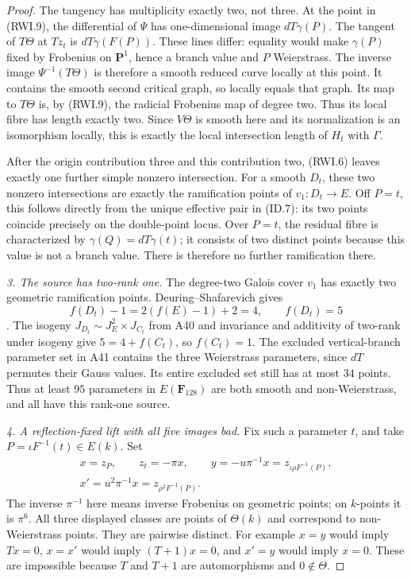 \documentclass[11pt,a4paper]{article}
\begin{document}
\begin{proof}
The tangency has multiplicity exactly two, not three.
At the point in (RWI.9), the differential of $\Psi$ has
one-dimensional image $dT\gamma(P)$. The tangent of
$T\Theta$ at $Tz_t$ is $dT\gamma(F(P))$.
These lines differ: equality would make $\gamma(P)$
fixed by Frobenius on $\mathbf P^1$, hence a branch
value and $P$ Weierstrass. The inverse image
$\Psi^{-1}(T\Theta)$ is therefore a smooth reduced
curve locally at this point. It contains the smooth
second critical graph, so locally equals that graph.
Its map to $T\Theta$ is, by (RWI.9), the radicial
Frobenius map of degree two. Thus its local fibre has
length exactly two. Since $V\Theta$ is smooth here
and its normalization is an isomorphism locally, this
is exactly the local intersection length of $H_t$
with $\Gamma$.

After the origin contribution three and this contribution
two, (RWI.6) leaves exactly one further simple nonzero
intersection. For a smooth $D_t$, these two nonzero
intersections are exactly the ramification points of
$v_1:D_t\to E$. Off $P=t$, this follows directly from
the unique effective pair in (ID.7): its two points
coincide precisely on the double-point locus. Over
$P=t$, the residual fibre is characterized by
$\gamma(Q)=dT\gamma(t)$; it consists of two distinct
points because this value is not a branch value.
There is therefore no further ramification there.

\emph{3. The source has two-rank one.}
The degree-two Galois cover $v_1$ has exactly two
geometric ramification points. Deuring--Shafarevich gives
\[
                 f(D_t)-1=2(f(E)-1)+2=4,
                      \qquad f(D_t)=5
 \tag{RWI.10}
\]
\cite[Corollary~1.8, pp.~35--36]{Crew1984}.
The isogeny $J_{D_t}\sim J_E^2\times J_{C_t}$ from
A40 and invariance and additivity of two-rank under
isogeny give $5=4+f(C_t)$, so $f(C_t)=1$.
The excluded vertical-branch parameter set in A41
contains the three Weierstrass parameters, since
$dT$ permutes their Gauss values. Its entire excluded
set still has at most $34$ points. Thus at least $95$
parameters in $E(\mathbf F_{128})$ are both smooth and
non-Weierstrass, and all have this rank-one source.

\emph{4. A reflection-fixed lift with all five images bad.}
Fix such a parameter $t$, and take
$P=\iota F^{-1}(t)\in E(k)$. Set
\[
 \begin{gathered}
 x=z_P,\qquad z_t=-\pi x,\qquad
 y=-u\pi^{-1}x=z_{\iota\rho F^{-1}(P)},\\
 x'=u^2\pi^{-1}x=z_{\rho^2F^{-1}(P)}.
 \end{gathered}
 \tag{RWI.11}
\]
The inverse $\pi^{-1}$ here means inverse Frobenius
on geometric points; on $k$-points it is $\pi^6$.
All three displayed classes are points of $\Theta(k)$
and correspond to non-Weierstrass points. They are
pairwise distinct. For example $x=y$ would imply
$Tx=0$, $x=x'$ would imply $(T+1)x=0$, and $x'=y$
would imply $x=0$. These are impossible because $T$
and $T+1$ are automorphisms and $0\notin\Theta$.


\end{proof}
\end{document}

